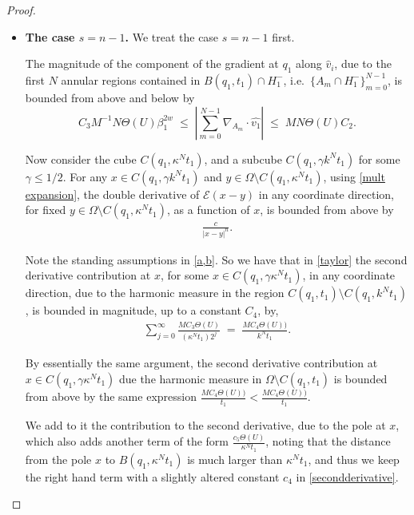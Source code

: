 \documentclass{article}
\theoremstyle{plain}
\theoremstyle{plain}
\theoremstyle{definition}
\theoremstyle{plain}
\newcommand{\proj}{\nabla_{A_{m}}\cdot \hat{v_1} }
\begin{document}
\begin{proof}


    

\begin{itemize}
\item 
\textbf{The case $s=n-1$.} We treat the case $s=n-1$ first.

The magnitude of the component of the gradient at $q_1$ along $\hat v_i$, due to the first $N$ annular regions contained in
$B(q_1,t_1)\cap H^{-}_1$, i.e.\ $\{A_m \cap H^{-}_1\}_{m=0}^{N-1}$,
is bounded from above and below by
\[
C_3 M^{-1} N \Theta(U) \beta_1^{2w}
\;\le\;
|\sum_{m=0}^{N-1} \proj|
\;\le\;
M N \Theta(U) C_2 .
\]

Now consider the cube $C(q_1,\kappa^N t_1)$, and a subcube
$C(q_1,\gamma k^N t_1)$ for some $\gamma\leq 1/2$. For any $x \in C(q_1,\gamma k^N t_1)$ and
$y \in \Omega \setminus C(q_1,\kappa^N t_1)$, using \cref{mult expansion}, the double derivative of
$\mathcal{E}(x-y)$ in any coordinate direction, for fixed $y \in \Omega \setminus C(q_1,\kappa^N t_1)$, as a function of $x$,
is bounded from above by
\begin{align}\label{eq43}
\frac{c}{|x-y|^n}.
\end{align}

Note the standing assumptions in \cref{a,b}. So we have that in \cref{taylor} the second derivative contribution at $x$, for some $x \in C(q_1,\gamma \kappa^N t_1)$, in any coordinate direction, due to the harmonic measure in the region
$C(q_1,t_1) \setminus C(q_1,k^N t_1)$, is bounded in magnitude, up to a constant $C_4$, by,
\begin{align}\label{secondderivative}
\sum_{j=0}^{\infty} \frac{MC_3\Theta(U)}{( \kappa^N t_1) 2^j}
\;=\;
\frac{MC_4 \Theta(U))}{k^N t_1}.
\end{align}

By essentially the same argument, the second derivative contribution at $x\in C(q_1,\gamma \kappa^{N}t_1)$ due the harmonic measure in $\Omega\setminus C(q_1,t_1)$ is bounded from above by the same expression $\frac{MC_4 \Theta(U))}{ t_1}< \frac{MC_4 \Theta(U))}{ t_1}$.

We add to it the contribution to the second derivative, due to the pole at $x$, which also adds another term of the form $\frac{c_5 \Theta(U)}{\kappa^N t_1}$, noting that the distance from the pole $x$ to $B(q_1,\kappa^N t_1)$ is much larger than $\kappa^N t_1$, and thus we keep the right hand term with a slightly altered constant $c_4$ in \cref{secondderivative}. 


\end{itemize}
\end{proof}
\end{document}
